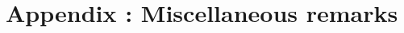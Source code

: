 \setcounter{figure}{0} 
\setcounter{table}{0}
\setcounter{footnote}{0}
\setcounter{equation}{0}
\pagestyle{fancy}
\fancyhf{}
\renewcommand{\chaptermark}[1]{\markboth{\MakeUppercase{#1 }}{}}
\renewcommand{\sectionmark}[1]{\markright{\thesection~ #1}}
\fancyhead[RO]{\bfseries\rightmark}
\fancyhead[LE]{\bfseries\leftmark}
\fancyfoot[RO]{\thepage}
\fancyfoot[LE]{\thepage}
\renewcommand{\headrulewidth}{0.5pt}
\renewcommand{\footrulewidth}{0pt}

\makeatletter
\renewcommand\thefigure{A.\arabic{figure}}
\renewcommand\thetable{A.\arabic{table}} 
\makeatother

\chapter{Appendix : Miscellaneous remarks}
\graphicspath{{Annexe1/figures/}}


